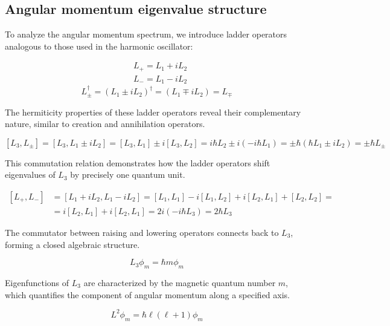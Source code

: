 \documentclass[italian]{HKNdocument}
\begin{document}
\subsection{Angular momentum eigenvalue structure}
To analyze the angular momentum spectrum, we introduce ladder operators analogous to those used in the harmonic oscillator:

\begin{align}
& L_{+}=L_{1}+i L_{2} \\
& L_{-}=L_{1}-i L_{2}
\end{align}
\begin{equation}
L_{ \pm}^{\dagger}=\left(L_{1} \pm i L_{2}\right)^{\dagger}=\left(L_{1} \mp i L_{2}\right)=L_{\mp}
\end{equation}

The hermiticity properties of these ladder operators reveal their complementary nature, similar to creation and annihilation operators.

\begin{equation}
\left[L_{3}, L_{ \pm}\right]=\left[L_{3}, L_{1} \pm i L_{2}\right]=\left[L_{3}, L_{1}\right] \pm i\left[L_{3}, L_{2}\right]=i \hbar L_{2} \pm i\left(-i \hbar L_{1}\right)= \pm \hbar\left(\hbar L_{1} \pm i L_{2}\right)= \pm \hbar L_{ \pm}
\end{equation}

This commutation relation demonstrates how the ladder operators shift eigenvalues of $L_3$ by precisely one quantum unit.

\begin{align}
{\left[L_{+}, L_{-}\right] } & =\left[L_{1}+i L_{2}, L_{1}-i L_{2}\right]=\left[L_{1}, L_{1}\right]-i\left[L_{1}, L_{2}\right]+i\left[L_{2}, L_{1}\right]+\left[L_{2}, L_{2}\right]= \\
& =i\left[L_{2}, L_{1}\right]+i\left[L_{2}, L_{1}\right]=2 i\left(-i \hbar L_{3}\right)=2 \hbar L_{3}
\end{align}

The commutator between raising and lowering operators connects back to $L_3$, forming a closed algebraic structure.

\begin{equation}
L_{3} \phi_{m}=\hbar m \phi_{m}
\end{equation}

Eigenfunctions of $L_3$ are characterized by the magnetic quantum number $m$, which quantifies the component of angular momentum along a specified axis.

\begin{equation}
L^{2} \phi_{m}=\hbar \ell(\ell+1) \phi_{m}
\end{equation}
\end{document}
